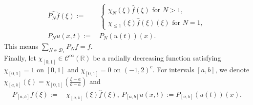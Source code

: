 \documentclass[reqno]{amsart}
\theoremstyle{Definitionl}
\theoremstyle{Definitionk}
\theoremstyle{definition}
\theoremstyle{Satzk}
\theoremstyle{Satzl}
\theoremstyle{Bemerkung}
\begin{document}
\begin{align*}
\widehat{P_Nf}(\xi):=&\, \begin{cases}\chi_N(\xi)\widehat f(\xi)\text{ for $N>1$},\\
\chi_{\le1}(\xi)\widehat f(\xi)(\xi)\text{ for $N=1$},
\end{cases}\\
P_Nu(x,t):=&\,P_N(u(t))(x).
\end{align*}
This means $\sum_{N\in\mathcal D_1}P_Nf=f$.\\[10pt]
Finally, let $\chi_{[0,1]}\in\mathcal C^{\infty}(\mathbb R)$ be a radially decreasing function satisfying $\chi_{[0,1]}=1$ on $[0,1]$ and $\chi_{[0,1]}=0$ on $(-1,2)^c$. For intervals $[a,b]$, we denote $\chi_{[a,b]}(\xi)=\chi_{[0,1]}(\tfrac{\xi-a}{b-a})$ and
\begin{align*}
P_{[a,b]}f(\xi):=&\, \chi_{[a,b]}(\xi)\widehat f(\xi),\ 
P_{[a,b]}u(x,t):= P_{[a,b]}(u(t))(x).
\end{align*}
\end{document}
